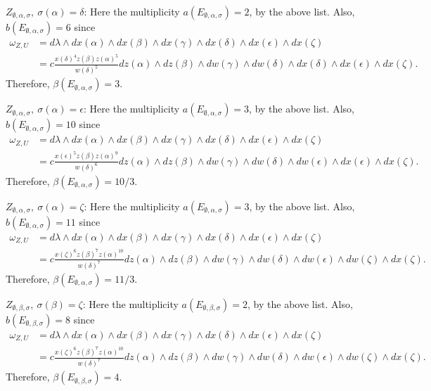 \documentclass[12pt,letterpaper]{amsart}
\begin{document}
\medskip
$Z_{\emptyset,\alpha,\sigma}, \ \sigma(\alpha)=\delta$:
Here the multiplicity $a(E_{\emptyset,\alpha,\sigma})=2$, by the
above list. Also, $b(E_{\emptyset,\alpha,\sigma})=6$ since
\[
\begin{split}
\omega_{Z,U}
&=d\lambda\wedge dx(\alpha)\wedge dx(\beta)\wedge dx(\gamma)
\wedge dx(\delta)\wedge dx(\epsilon)\wedge dx(\zeta)\\
&=c\frac{x(\delta)^4z(\beta)z(\alpha)^5}{w(\delta)^5}
dz(\alpha)\wedge dz(\beta)\wedge dw(\gamma)\wedge dw(\delta)
\wedge dx(\delta)\wedge dx(\epsilon)\wedge dx(\zeta).
\end{split}
\]
Therefore, $\beta(E_{\emptyset,\alpha,\sigma})=3$.

\medskip
$Z_{\emptyset,\alpha,\sigma}, \ \sigma(\alpha)=\epsilon$:
Here the multiplicity $a(E_{\emptyset,\alpha,\sigma})=3$, by the
above list. Also, $b(E_{\emptyset,\alpha,\sigma})=10$ since
\[
\begin{split}
\omega_{Z,U}
&=d\lambda\wedge dx(\alpha)\wedge dx(\beta)\wedge dx(\gamma)
\wedge dx(\delta)\wedge dx(\epsilon)\wedge dx(\zeta)\\
&=c\frac{x(\epsilon)^5z(\beta)z(\alpha)^9}{w(\delta)^6}
dz(\alpha)\wedge dz(\beta)\wedge dw(\gamma)\wedge dw(\delta)
\wedge dw(\epsilon)\wedge dx(\epsilon)\wedge dx(\zeta).
\end{split}
\]
Therefore, $\beta(E_{\emptyset,\alpha,\sigma})=10/3$.

\medskip
$Z_{\emptyset,\alpha,\sigma}, \ \sigma(\alpha)=\zeta$:
Here the multiplicity $a(E_{\emptyset,\alpha,\sigma})=3$, by the
above list. Also, $b(E_{\emptyset,\alpha,\sigma})=11$ since
\[
\begin{split}
\omega_{Z,U}
&=d\lambda\wedge dx(\alpha)\wedge dx(\beta)\wedge dx(\gamma)
\wedge dx(\delta)\wedge dx(\epsilon)\wedge dx(\zeta)\\
&=c\frac{x(\zeta)^6z(\beta)^7z(\alpha)^{10}}{w(\delta)^7}
dz(\alpha)\wedge dz(\beta)\wedge dw(\gamma)\wedge dw(\delta)
\wedge dw(\epsilon)\wedge dw(\zeta)\wedge dx(\zeta).
\end{split}
\]
Therefore, $\beta(E_{\emptyset,\alpha,\sigma})=11/3$.

\medskip
$Z_{\emptyset,\beta,\sigma}, \ \sigma(\beta)=\zeta$:
Here the multiplicity $a(E_{\emptyset,\beta,\sigma})=2$, by the
above list. Also, $b(E_{\emptyset,\beta,\sigma})=8$ since
\[
\begin{split}
\omega_{Z,U}
&=d\lambda\wedge dx(\alpha)\wedge dx(\beta)\wedge dx(\gamma)
\wedge dx(\delta)\wedge dx(\epsilon)\wedge dx(\zeta)\\
&=c\frac{x(\zeta)^6z(\beta)^7z(\alpha)^{10}}{w(\delta)^7}
dz(\alpha)\wedge dz(\beta)\wedge dw(\gamma)\wedge dw(\delta)
\wedge dw(\epsilon)\wedge dw(\zeta)\wedge dx(\zeta).
\end{split}
\]
Therefore, $\beta(E_{\emptyset,\beta,\sigma})=4$.
\end{document}
